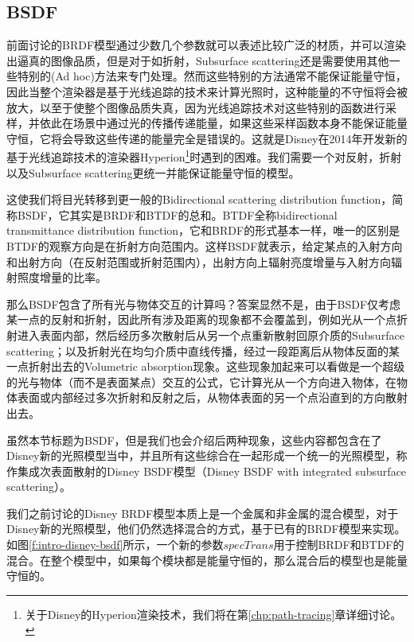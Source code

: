 \subsection{BSDF}\label{sec:intro-bsdf}
前面讨论的BRDF模型通过少数几个参数就可以表述比较广泛的材质，并可以渲染出逼真的图像品质，但是对于如折射，Subsurface scattering还是需要使用其他一些特别的(Ad hoc)方法来专门处理。然而这些特别的方法通常不能保证能量守恒，因此当整个渲染器是基于光线追踪的技术来计算光照时，这种能量的不守恒将会被放大，以至于使整个图像品质失真，因为光线追踪技术对这些特别的函数进行采样，并依此在场景中通过光的传播传递能量，如果这些采样函数本身不能保证能量守恒，它将会导致这些传递的能量完全是错误的。这就是Disney在2014年开发新的基于光线追踪技术的渲染器Hyperion\footnote{关于Disney的Hyperion渲染技术，我们将在第\ref{chp:path-tracing}章详细讨论。}时遇到的困难。我们需要一个对反射，折射以及Subsurface scattering更统一并能保证能量守恒的模型。

这使我们将目光转移到更一般的Bidirectional scattering distribution function，简称BSDF，它其实是BRDF和BTDF的总和。BTDF全称bidirectional transmittance distribution function，它和BRDF的形式基本一样，唯一的区别是BTDF的观察方向是在折射方向范围内。这样BSDF就表示，给定某点的入射方向和出射方向（在反射范围或折射范围内），出射方向上辐射亮度增量与入射方向辐射照度增量的比率。

那么BSDF包含了所有光与物体交互的计算吗？答案显然不是，由于BSDF仅考虑某一点的反射和折射，因此所有涉及距离的现象都不会覆盖到，例如光从一个点折射进入表面内部，然后经历多次散射后从另一个点重新散射回原介质的Subsurface scattering；以及折射光在均匀介质中直线传播，经过一段距离后从物体反面的某一点折射出去的Volumetric absorption现象。这些现象加起来可以看做是一个超级的光与物体（而不是表面某点）交互的公式，它计算光从一个方向进入物体，在物体表面或内部经过多次折射和反射之后，从物体表面的另一个点沿直到的方向散射出去。

虽然本节标题为BSDF，但是我们也会介绍后两种现象，这些内容都包含在了Disney新的光照模型当中，并且所有这些综合在一起形成一个统一的光照模型，称作集成次表面散射的Disney BSDF模型\cite{a:ExtendingtheDisneyBRDFtoaBSDFwithIntegratedSubsurfaceScattering}（Disney BSDF with integrated subsurface scattering）。

我们之前讨论的Disney BRDF模型本质上是一个金属和非金属的混合模型，对于Disney新的光照模型，他们仍然选择混合的方式，基于已有的BRDF模型来实现。如图\ref{f:intro-disney-bsdf}所示，一个新的参数$specTrans$用于控制BRDF和BTDF的混合。在整个模型中，如果每个模块都是能量守恒的，那么混合后的模型也是能量守恒的。

